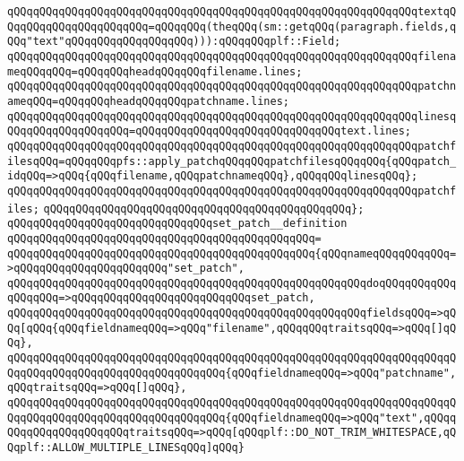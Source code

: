 \verb|qQQqqQQqqQQqqQQqqQQqqQQqqQQqqQQqqQQqqQQqqQQqqQQqqQQqqQQqqQQqqQQqtextqQQqqQQqqQQqqQQqqQQqqQQq=qQQqqQQq(theqQQq(sm::getqQQq(paragraph.fields,qQQq"text"qQQqqQQqqQQqqQQqqQQq))):qQQqqQQqplf::Field;|\newline
\newline
\verb|qQQqqQQqqQQqqQQqqQQqqQQqqQQqqQQqqQQqqQQqqQQqqQQqqQQqqQQqqQQqqQQqfilenameqQQqqQQq=qQQqqQQqheadqQQqqQQqfilename.lines;|\newline
\verb|qQQqqQQqqQQqqQQqqQQqqQQqqQQqqQQqqQQqqQQqqQQqqQQqqQQqqQQqqQQqqQQqpatchnameqQQq=qQQqqQQqheadqQQqqQQqpatchname.lines;|\newline
\verb|qQQqqQQqqQQqqQQqqQQqqQQqqQQqqQQqqQQqqQQqqQQqqQQqqQQqqQQqqQQqqQQqlinesqQQqqQQqqQQqqQQqqQQq=qQQqqQQqqQQqqQQqqQQqqQQqqQQqqQQqtext.lines;|\newline
\newline
\verb|qQQqqQQqqQQqqQQqqQQqqQQqqQQqqQQqqQQqqQQqqQQqqQQqqQQqqQQqqQQqqQQqpatchfilesqQQq=qQQqqQQqpfs::apply_patchqQQqqQQqpatchfilesqQQqqQQq{qQQqpatch_idqQQq=>qQQq{qQQqfilename,qQQqpatchnameqQQq},qQQqqQQqlinesqQQq};|\newline
\newline
\verb|qQQqqQQqqQQqqQQqqQQqqQQqqQQqqQQqqQQqqQQqqQQqqQQqqQQqqQQqqQQqqQQqpatchfiles;|\newline
\verb|qQQqqQQqqQQqqQQqqQQqqQQqqQQqqQQqqQQqqQQqqQQqqQQq};|\newline
\newline
\verb|qQQqqQQqqQQqqQQqqQQqqQQqqQQqqQQqset_patch__definition|\newline
\verb|qQQqqQQqqQQqqQQqqQQqqQQqqQQqqQQqqQQqqQQqqQQqqQQq=|\newline
\verb|qQQqqQQqqQQqqQQqqQQqqQQqqQQqqQQqqQQqqQQqqQQqqQQq{qQQqnameqQQqqQQqqQQq=>qQQqqQQqqQQqqQQqqQQqqQQq"set_patch",|\newline
\verb|qQQqqQQqqQQqqQQqqQQqqQQqqQQqqQQqqQQqqQQqqQQqqQQqqQQqqQQqdoqQQqqQQqqQQqqQQqqQQq=>qQQqqQQqqQQqqQQqqQQqqQQqqQQqset_patch,|\newline
\verb|qQQqqQQqqQQqqQQqqQQqqQQqqQQqqQQqqQQqqQQqqQQqqQQqqQQqqQQqfieldsqQQq=>qQQq[qQQq{qQQqfieldnameqQQq=>qQQq"filename",qQQqqQQqtraitsqQQq=>qQQq[]qQQq},|\newline
\verb|qQQqqQQqqQQqqQQqqQQqqQQqqQQqqQQqqQQqqQQqqQQqqQQqqQQqqQQqqQQqqQQqqQQqqQQqqQQqqQQqqQQqqQQqqQQqqQQqqQQqqQQq{qQQqfieldnameqQQq=>qQQq"patchname",qQQqtraitsqQQq=>qQQq[]qQQq},|\newline
\verb|qQQqqQQqqQQqqQQqqQQqqQQqqQQqqQQqqQQqqQQqqQQqqQQqqQQqqQQqqQQqqQQqqQQqqQQqqQQqqQQqqQQqqQQqqQQqqQQqqQQqqQQq{qQQqfieldnameqQQq=>qQQq"text",qQQqqQQqqQQqqQQqqQQqqQQqtraitsqQQq=>qQQq[qQQqplf::DO_NOT_TRIM_WHITESPACE,qQQqplf::ALLOW_MULTIPLE_LINESqQQq]qQQq}|\newline
